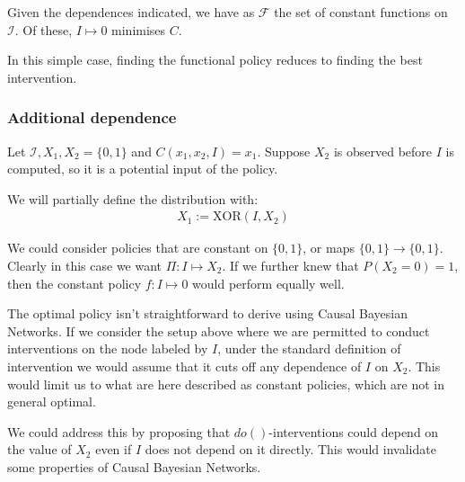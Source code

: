 Given the dependences indicated, we have as $\mathcal{F}$ the set of constant functions on $\mathcal{I}$. Of these, $I\mapsto0$ minimises $C$.

In this simple case, finding the functional policy reduces to finding the best intervention. 

\subsubsection{Additional dependence}

Let $\mathcal{I},X_1,X_2=\{0,1\}$ and $C(x_1,x_2,I)=x_1$. Suppose $X_2$ is observed before $I$ is computed, so it is a potential input of the policy.

\begin{center}
\end{center}

We will partially define the distribution with:
\begin{align*}
    X_1 := \mathrm{XOR}(I,X_2)
\end{align*}

We could consider policies that are constant on $\{0,1\}$, or maps $\{0,1\}\to\{0,1\}$. Clearly in this case we want $\Pi:I\mapsto X_2$. If we further knew that $P(X_2=0)=1$, then the constant policy $f:I\mapsto 0$ would perform equally well.

\begin{remark}
The optimal policy isn't straightforward to derive using Causal Bayesian Networks. If we consider the setup above where we are permitted to conduct interventions on the node labeled by $I$, under the standard definition of intervention we would assume that it cuts off any dependence of $I$ on $X_2$. This would limit us to what are here described as constant policies, which are not in general optimal. 

We could address this by proposing that $do()$-interventions could depend on the value of $X_2$ even if $I$ does not depend on it directly. This would invalidate some properties of Causal Bayesian Networks.
\end{remark}


